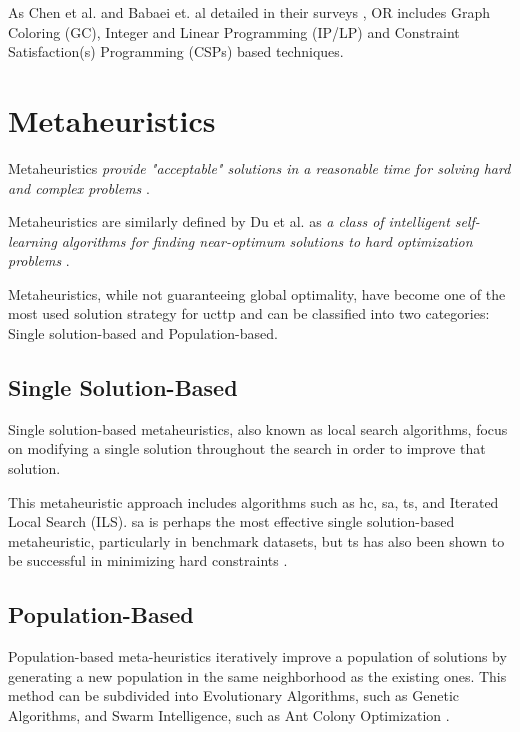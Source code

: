 As Chen et al. and  Babaei et. al detailed in their surveys \cite{babaei_survey_2015,chen_survey_2021}, OR includes Graph Coloring (GC), Integer and Linear Programming (IP/LP) and Constraint Satisfaction(s) Programming (CSPs) based techniques.

\section{Metaheuristics}

Metaheuristics \textit{provide "acceptable" solutions in a reasonable time for solving hard and complex problems} \cite{talbi2009metaheuristics}. 

Metaheuristics are similarly defined by Du et al. as \textit{a class of intelligent self-learning algorithms for finding near-optimum solutions to hard optimization problems} \cite{du2016search}.

Metaheuristics, while not guaranteeing global optimality, have become one of the most used solution strategy for \ac{ucttp} and can be classified into two categories: Single solution-based and Population-based.

\subsection{Single Solution-Based}

Single solution-based metaheuristics, also known as local search algorithms, focus on modifying a single solution throughout the search in order to improve that solution. 

This metaheuristic approach includes algorithms such as \ac{hc}, \ac{sa}, \ac{ts}, and Iterated Local Search (ILS). \ac{sa} is perhaps the most effective single solution-based metaheuristic, particularly in benchmark datasets, but \ac{ts} has also been shown to be successful in minimizing hard constraints \cite{abdipoor_meta-heuristic_2023}.

\subsection{Population-Based}

Population-based meta-heuristics iteratively improve a population of solutions by generating a new population in the same neighborhood as the existing ones. This method can be subdivided into Evolutionary Algorithms, such as Genetic Algorithms, and Swarm Intelligence, such as Ant Colony Optimization \cite{abdipoor_meta-heuristic_2023,du2016search}.


